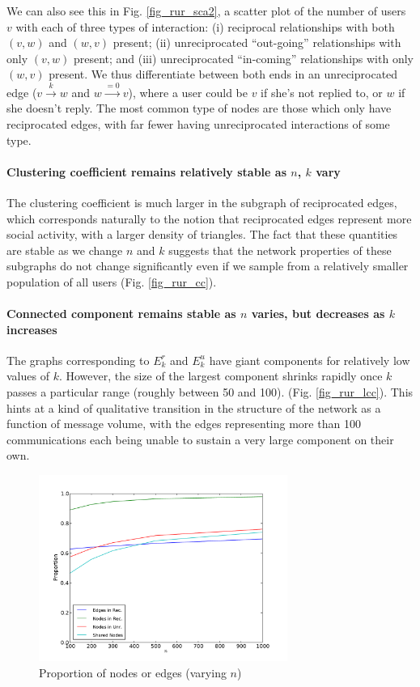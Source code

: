 \documentclass[conference]{IEEEtran}
\begin{document}
We can also see this in Fig. \ref{fig_rur_sca2}, a scatter plot of the
number of users $v$ with each of three types of interaction:
(i) reciprocal relationships with both $(v,w)$ and $(w,v)$ present;
(ii) unreciprocated ``out-going'' relationships with only $(v,w)$ present;
and 
(iii) unreciprocated ``in-coming'' relationships with only $(w,v)$ present.
We thus differentiate between both ends in an
unreciprocated edge ($v \xrightarrow{k} w$ and $w \xrightarrow{=0} v$),
where a user could be $v$ if she's not replied to, or $w$ if she
doesn't reply.  The most common type of nodes are those which only
have reciprocated edges, with far fewer having unreciprocated
interactions of some type.

\paragraph*{Clustering coefficient remains relatively stable as $n$, $k$ vary}
The clustering coefficient is much larger in the subgraph of reciprocated
edges, which corresponds naturally to the notion that reciprocated 
edges represent more social activity, with a larger density of triangles.
The fact that these quantities are stable as we change $n$ and $k$ suggests
that the network properties of these subgraphs do not change significantly even if we sample from a relatively smaller population of all users (Fig. \ref{fig_rur_cc}).

\paragraph*{Connected component remains stable as $n$ varies, but decreases as $k$ increases} 
The graphs corresponding to $E_k^r$ and $E_k^u$ have giant components
for relatively low values of $k$.
However, the size of the largest component shrinks rapidly once 
$k$ passes a particular range (roughly between 50 and 100).
(Fig. \ref{fig_rur_lcc}).
This hints at a kind of qualitative transition in the structure of the
network as a function of message volume, with the edges representing 
more than 100 communications each being unable to sustain a very large
component on their own.

\begin{figure}[!t]
\centering
\includegraphics[width=3.2in]{proportion_edgesnodes_n}                
\caption{Proportion of nodes or edges (varying $n$)}
\label{fig_rur_propn}
\end{figure}
\end{document}
